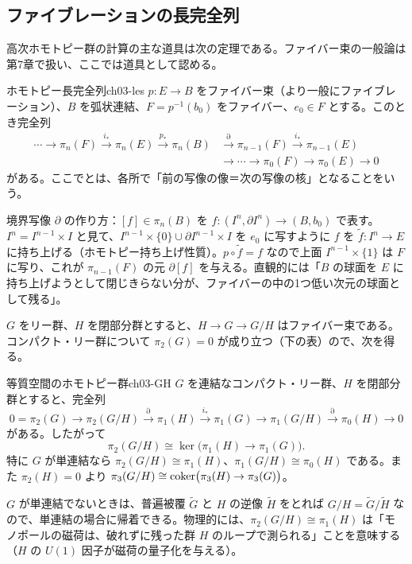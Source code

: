 \subsection{ファイブレーションの長完全列}
高次ホモトピー群の計算の主な道具は次の定理である。ファイバー束の一般論は第7章で扱い、ここでは道具として認める。

\begin{mythm}{ホモトピー長完全列}{ch03-les}
$p\colon E\to B$ をファイバー束（より一般にファイブレーション）、$B$ を弧状連結、$F=p^{-1}(b_0)$ をファイバー、$e_0\in F$ とする。このとき完全列
\[
\begin{aligned}\cdots\to\pi_n(F)\xrightarrow{i_*}\pi_n(E)\xrightarrow{p_*}\pi_n(B)&\xrightarrow{\partial}\pi_{n-1}(F)\xrightarrow{i_*}\pi_{n-1}(E)\\&\to\cdots\to\pi_0(F)\to\pi_0(E)\to0\end{aligned}
\]
がある。ここでとは、各所で「前の写像の像＝次の写像の核」となることをいう。
\end{mythm}
\begin{note}
境界写像 $\partial$ の作り方：$[f]\in\pi_n(B)$ を $f\colon(I^n,\partial I^n)\to(B,b_0)$ で表す。$I^n=I^{n-1}\times I$ と見て、$I^{n-1}\times\{0\}\cup\partial I^{n-1}\times I$ を $e_0$ に写すように $f$ を $\tilde f\colon I^n\to E$ に持ち上げる（ホモトピー持ち上げ性質）。$p\circ\tilde f=f$ なので上面 $I^{n-1}\times\{1\}$ は $F$ に写り、これが $\pi_{n-1}(F)$ の元 $\partial[f]$ を与える。直観的には「$B$ の球面を $E$ に持ち上げようとして閉じきらない分が、ファイバーの中の1つ低い次元の球面として残る」。
\end{note}

$G$ をリー群、$H$ を閉部分群とすると、$H\to G\to G/H$ はファイバー束である。コンパクト・リー群について $\pi_2(G)=0$ が成り立つ（下の表）ので、次を得る。

\begin{mythm}{等質空間のホモトピー群}{ch03-GH}
$G$ を連結なコンパクト・リー群、$H$ を閉部分群とすると、完全列
\[
0=\pi_2(G)\to\pi_2(G/H)\xrightarrow{\partial}\pi_1(H)\xrightarrow{i_*}\pi_1(G)\to\pi_1(G/H)\xrightarrow{\partial}\pi_0(H)\to0
\]
がある。したがって
\[
\pi_2(G/H)\cong\ker\bigl(\pi_1(H)\to\pi_1(G)\bigr).
\]
特に $G$ が単連結なら $\pi_2(G/H)\cong\pi_1(H)$、$\pi_1(G/H)\cong\pi_0(H)$ である。また $\pi_2(H)=0$ より $\pi_3(G/H)\cong\operatorname{coker}\bigl(\pi_3(H)\to\pi_3(G)\bigr)$。
\end{mythm}
$G$ が単連結でないときは、普遍被覆 $\tilde G$ と $H$ の逆像 $\tilde H$ をとれば $G/H=\tilde G/\tilde H$ なので、単連結の場合に帰着できる。物理的には、$\pi_2(G/H)\cong\pi_1(H)$ は「モノポールの磁荷は、破れずに残った群 $H$ のループで測られる」ことを意味する（$H$ の $U(1)$ 因子が磁荷の量子化を与える）。

